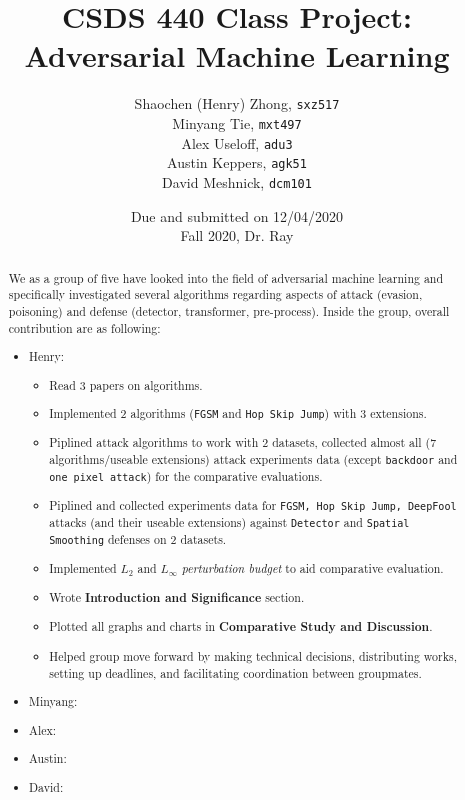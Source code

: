 \documentclass[11pt]{article}
\newcommand{\ilc}{\texttt}
\begin{document}
\title{\textbf{CSDS 440 Class Project: \\Adversarial Machine Learning}}

\author{Shaochen (Henry) Zhong, \ilc{sxz517} \\ Minyang Tie, \ilc{mxt497} \\ Alex Useloff, \ilc{adu3} \\ Austin Keppers, \ilc{agk51} \\ David Meshnick, \ilc{dcm101}\\}
\date{Due and submitted on 12/04/2020 \\ Fall 2020, Dr. Ray}
\maketitle

\renewcommand{\abstractname}{Contributions}
\begin{abstract}
We as a group of five have looked into the field of adversarial machine learning and specifically investigated several algorithms regarding aspects of attack (evasion, poisoning) and defense (detector, transformer, pre-process). Inside the group, overall contribution are as following:
\begin{itemize}
    \item Henry:
    \begin{itemize}
        \item Read 3 papers on algorithms.
        \item Implemented 2 algorithms (\ilc{FGSM} and \ilc{Hop Skip Jump}) with 3 extensions.
        \item Piplined attack algorithms to work with 2 datasets, collected almost all (7 algorithms/useable extensions) attack experiments data (except \ilc{backdoor} and \ilc{one pixel attack}) for the comparative evaluations.
        \item Piplined and collected experiments data for \ilc{FGSM, Hop Skip Jump, DeepFool} attacks (and their useable extensions) against \ilc{Detector} and \ilc{Spatial Smoothing} defenses on 2 datasets.
        \item Implemented $L_2$ and $L_{\infty}$ \textit{perturbation budget} to aid comparative evaluation.
        \item Wrote \textbf{Introduction and Significance} section.
        \item Plotted all graphs and charts in \textbf{Comparative Study and Discussion}.
        \item Helped group move forward by making technical decisions, distributing works, setting up deadlines, and facilitating coordination between groupmates.
    \end{itemize}
    \item Minyang:
    \item Alex:
    \item Austin:
    \item David:
\end{itemize}
\end{abstract}
\end{document}
